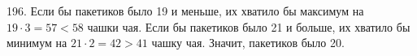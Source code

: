 196. Если бы пакетиков было 19 и меньше, их хватило бы максимум на $19\cdot3=57<58$ чашки чая. Если бы пакетиков было 21 и больше, их хватило бы минимум на $21\cdot2=42>41$ чашку чая. Значит, пакетиков было 20.\\
